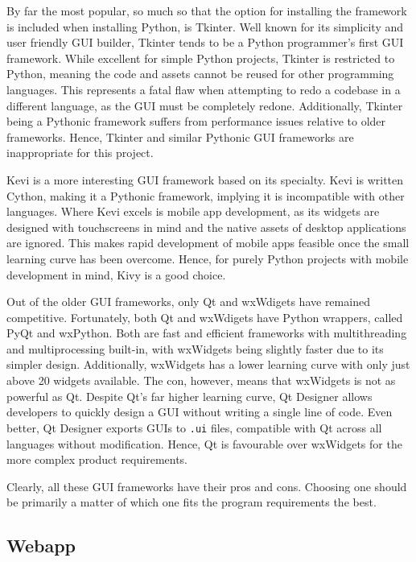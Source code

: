 \documentclass[11pt]{article}
\begin{document}
By far the most popular, so much so that the option for installing the framework is included when installing Python, is Tkinter. Well known for its simplicity and user friendly GUI builder, Tkinter tends to be a Python programmer's first GUI framework. While excellent for simple Python projects, Tkinter is restricted to Python, meaning the code and assets cannot be reused for other programming languages. This represents a fatal flaw when attempting to redo a codebase in a different language, as the GUI must be completely redone. Additionally, Tkinter being a Pythonic framework suffers from performance issues relative to older frameworks. Hence, Tkinter and similar Pythonic GUI frameworks are inappropriate for this project.

Kevi is a more interesting GUI framework based on its specialty. Kevi is written Cython, making it a Pythonic framework, implying it is incompatible with other languages. Where Kevi excels is mobile app development, as its widgets are designed with touchscreens in mind and the native assets of desktop applications are ignored. This makes rapid development of mobile apps feasible once the small learning curve has been overcome. Hence, for purely Python projects with mobile development in mind, Kivy is a good choice.

Out of the older GUI frameworks, only Qt and wxWdigets have remained competitive. Fortunately, both Qt and wxWdigets have Python wrappers, called PyQt and wxPython. Both are fast and efficient frameworks with multithreading and multiprocessing built-in, with wxWidgets being slightly faster due to its simpler design. Additionally, wxWidgets has a lower learning curve with only just above 20 widgets available. The con, however, means that wxWidgets is not as powerful as Qt. Despite Qt's far higher learning curve, Qt Designer allows developers to quickly design a GUI without writing a single line of code. Even better, Qt Designer exports GUIs to \texttt{.ui} files, compatible with Qt across all languages without modification. Hence, Qt is favourable over wxWidgets for the more complex product requirements.

Clearly, all these GUI frameworks have their pros and cons. Choosing one should be primarily a matter of which one fits the program requirements the best.

\subsection{Webapp}
\end{document}
